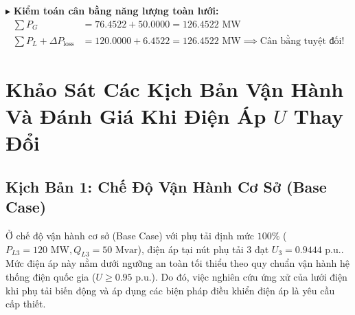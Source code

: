 \documentclass[12pt,a4paper,oneside]{report}
\begin{document}
\begin{table}[H]
\centering
\caption{Dòng công suất trên các nhánh và tổn thất công suất sau hội tụ.}
\label{tab:converged_branches}
\end{table}

\noindent $\blacktriangleright$ \textbf{Kiểm toán cân bằng năng lượng toàn lưới:}
\begin{align}
\sum P_G &= 76.4522 + 50.0000 = 126.4522\text{ MW} \\
\sum P_L + \Delta P_{\text{loss}} &= 120.0000 + 6.4522 = 126.4522\text{ MW} \implies \text{Cân bằng tuyệt đối!}
\end{align}

\chapter{Khảo Sát Các Kịch Bản Vận Hành Và Đánh Giá Khi Điện Áp $U$ Thay Đổi}

\section{Kịch Bản 1: Chế Độ Vận Hành Cơ Sở (Base Case)}
Ở chế độ vận hành cơ sở (Base Case) với phụ tải định mức $100\%$ ($P_{L3} = 120\text{ MW}, Q_{L3} = 50\text{ Mvar}$), điện áp tại nút phụ tải 3 đạt $U_3 = 0.9444\text{ p.u.}$. Mức điện áp này nằm dưới ngưỡng an toàn tối thiểu theo quy chuẩn vận hành hệ thống điện quốc gia ($U \ge 0.95\text{ p.u.}$). Do đó, việc nghiên cứu ứng xử của lưới điện khi phụ tải biến động và áp dụng các biện pháp điều khiển điện áp là yêu cầu cấp thiết.
\end{document}
